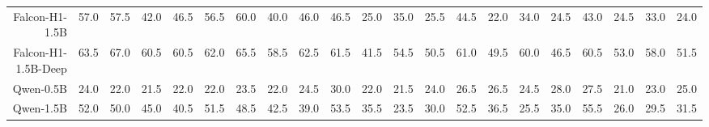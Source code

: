\begin{table}[t]
{\begin{tabular}{rrrrr|rrrr|rrrr|rrrr|rrrr}
Falcon-H1-1.5B & \cellcolor[HTML]{E2ECCC}57.0 & \cellcolor[HTML]{E1ECCC}57.5 & \cellcolor[HTML]{FFF1CC}42.0 & \cellcolor[HTML]{F7F1CC}46.5 & \cellcolor[HTML]{E1ECCC}56.5 & \cellcolor[HTML]{DAEBCC}60.0 & \cellcolor[HTML]{FEEFCC}40.0 & \cellcolor[HTML]{F7F0CC}46.0 & \cellcolor[HTML]{FAF1CC}46.5 & \cellcolor[HTML]{FAD5CC}25.0 & \cellcolor[HTML]{FCE4CC}35.0 & \cellcolor[HTML]{FAD6CC}25.5 & \cellcolor[HTML]{FBF1CC}44.5 & \cellcolor[HTML]{F9D0CC}22.0 & \cellcolor[HTML]{FCE4CC}34.0 & \cellcolor[HTML]{FAD4CC}24.5 & \cellcolor[HTML]{FDF2CC}43.0 & \cellcolor[HTML]{FAD5CC}24.5 & \cellcolor[HTML]{FCE3CC}33.0 & \cellcolor[HTML]{FAD4CC}24.0 \\
 Falcon-H1-1.5B-Deep & \cellcolor[HTML]{D5EACC}63.5 & \cellcolor[HTML]{CEE8CC}67.0 & \cellcolor[HTML]{DBEBCC}60.5 & \cellcolor[HTML]{DBEBCC}60.5 & \cellcolor[HTML]{D6EACC}62.0 & \cellcolor[HTML]{CFE9CC}65.5 & \cellcolor[HTML]{DDEBCC}58.5 & \cellcolor[HTML]{D5EACC}62.5 & \cellcolor[HTML]{DCEBCC}61.5 & \cellcolor[HTML]{FEEECC}41.5 & \cellcolor[HTML]{EAEECC}54.5 & \cellcolor[HTML]{F2F0CC}50.5 & \cellcolor[HTML]{D6EACC}61.0 & \cellcolor[HTML]{EFEFCC}49.5 & \cellcolor[HTML]{D8EACC}60.0 & \cellcolor[HTML]{F6F0CC}46.5 & \cellcolor[HTML]{D6EACC}60.5 & \cellcolor[HTML]{E7EDCC}53.0 & \cellcolor[HTML]{DCEBCC}58.0 & \cellcolor[HTML]{EAEECC}51.5 \\
Qwen-0.5B & \cellcolor[HTML]{FAD6CC}24.0 & \cellcolor[HTML]{F9D3CC}22.0 & \cellcolor[HTML]{F9D2CC}21.5 & \cellcolor[HTML]{F9D3CC}22.0 & \cellcolor[HTML]{F9D4CC}22.0 & \cellcolor[HTML]{FAD6CC}23.5 & \cellcolor[HTML]{F9D4CC}22.0 & \cellcolor[HTML]{FAD7CC}24.5 & \cellcolor[HTML]{FBDDCC}30.0 & \cellcolor[HTML]{F9D1CC}22.0 & \cellcolor[HTML]{F9D0CC}21.5 & \cellcolor[HTML]{F9D4CC}24.0 & \cellcolor[HTML]{FAD8CC}26.5 & \cellcolor[HTML]{FAD8CC}26.5 & \cellcolor[HTML]{FAD4CC}24.5 & \cellcolor[HTML]{FBDACC}28.0 & \cellcolor[HTML]{FBDACC}27.5 & \cellcolor[HTML]{F9CFCC}21.0 & \cellcolor[HTML]{F9D3CC}23.0 & \cellcolor[HTML]{FAD6CC}25.0 \\
Qwen-1.5B & \cellcolor[HTML]{ECEECC}52.0 & \cellcolor[HTML]{F0EFCC}50.0 & \cellcolor[HTML]{FAF1CC}45.0 & \cellcolor[HTML]{FEEFCC}40.5 & \cellcolor[HTML]{ECEECC}51.5 & \cellcolor[HTML]{F2EFCC}48.5 & \cellcolor[HTML]{FEF2CC}42.5 & \cellcolor[HTML]{FEEDCC}39.0 & \cellcolor[HTML]{ECEECC}53.5 & \cellcolor[HTML]{FDE5CC}35.5 & \cellcolor[HTML]{F9D3CC}23.5 & \cellcolor[HTML]{FBDDCC}30.0 & \cellcolor[HTML]{E9EECC}52.5 & \cellcolor[HTML]{FDE8CC}36.5 & \cellcolor[HTML]{FAD6CC}25.5 & \cellcolor[HTML]{FDE6CC}35.0 & \cellcolor[HTML]{E1ECCC}55.5 & \cellcolor[HTML]{FAD8CC}26.0 & \cellcolor[HTML]{FBDDCC}29.5 & \cellcolor[HTML]{FCE1CC}31.5 \\

\end{tabular}}
\end{table}
